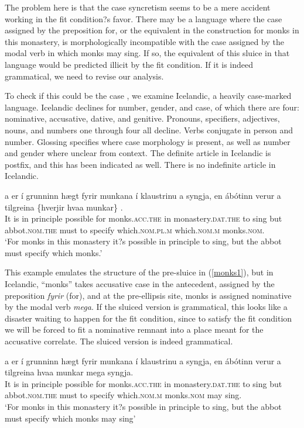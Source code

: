 \documentclass{turabian-researchpaper}
\begin{document}
\noindent The problem here is that the case syncretism seems to be a mere accident working in the fit condition?s favor. There may be a language where the case assigned by the preposition for, or the equivalent in the construction for monks in this monastery, is morphologically incompatible with the case assigned by the modal verb in which monks may sing. If so, the equivalent of this sluice in that language would be predicted illicit by the fit condition. If it is indeed grammatical, we need to revise our analysis. 

To check if this could be the case , we examine Icelandic, a heavily case-marked language. Icelandic declines for number, gender, and case, of which there are four: nominative, accusative, dative, and genitive. Pronouns, specifiers, adjectives, nouns, and numbers one through four all decline. Verbs conjugate in person and number. Glossing specifies where case morphology is present, as well as number and gender where unclear from context. The definite article in Icelandic is postfix, and this has been indicated as well. There is no indefinite article in Icelandic. 

\begin{exe}
\ex\label{monksis1}
\gll  \TH a{\dh} er \'i  grunninn h\ae gt fyrir munkana \'i klaustrinu a{\dh} syngja, en \'ab\'otinn ver\dh ur a{\dh} tilgreina \{hverjir \textbar hva\dh a munkar\} . \\ 
It is in principle possible for monks.\textsc{acc.the}  in monastery.\textsc{dat.the}  to   sing         but  abbot.\textsc{nom.the} must    to  specify   which.\textsc{nom.pl.m} which.\textsc{nom.m} monks.\textsc{nom}.\\ 
\trans `For monks in this monastery it?s possible in principle to sing, but the abbot must specify which monks.'
\end{exe}

This example emulates the structure of the pre-sluice in (\ref{monks1}), but in Icelandic, ``monks'' takes accusative case in the antecedent, assigned by the preposition \textit{fyrir} (for), and at the pre-ellipsis site, monks is assigned nominative by the modal verb \textit{mega}. If the sluiced version is grammatical, this looks like a disaster waiting to happen for the fit condition, since to satisfy the fit condition we will be forced to fit a nominative remnant into a place meant for the accusative correlate. The sluiced version is indeed grammatical. 

\begin{exe}
\ex\label{monksis2}
\gll \TH a{\dh} er \'i  grunninn h\ae gt fyrir munkana \'i klaustrinu a{\dh} syngja, en \'ab\'otinn ver\dh ur a{\dh} tilgreina hva\dh a munkar mega syngja. \\
It is in principle possible for monks.\textsc{acc.the}  in monastery.\textsc{dat.the}  to   sing         but  abbot.\textsc{nom.the} must    to  specify   which.\textsc{nom.m} monks.\textsc{nom} may  sing.\\ 
\trans `For monks in this monastery it?s possible in principle to sing, but the abbot must specify which monks may sing'
\end{exe}
\end{document}
